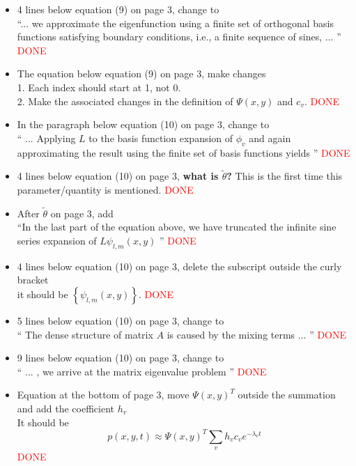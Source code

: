 \documentclass[12pt]{article}
\begin{document}
\begin{itemize}
\item 4 lines below equation (9) on page 3, change to \\
  ``... we approximate the eigenfunction using a finite set of orthogonal basis functions satisfying boundary conditions, i.e., a finite sequence of sines, ... ''
   \textcolor{red}{DONE}

\item The equation below equation (9) on page 3, make changes \\
1. Each index should start at 1, not 0. \\ 
2. Make the associated changes in the definition of $\Psi(x, y)$ and $c_v$.
   \textcolor{red}{DONE}

\item In the paragraph below equation (10) on page 3, change to \\ 
`` ... Applying $L$ to the basis function expansion of $\phi_v $ and again approximating 
the result using the finite set of basis functions yields ''
   \textcolor{red}{DONE}

 \item 4 lines below equation (10) on page 3, {\bf what is
     $\tilde{\theta} $?}  This is the first time this
   parameter/quantity is mentioned.  \textcolor{red}{DONE}

\item After $\tilde{\theta} $ on page 3, add \\
``In the last part of the equation above, we have truncated the infinite sine series 
expansion of $L \psi_{l, m}(x, y)$ ''
 \textcolor{red}{DONE}

\item 4 lines below equation (10) on page 3, delete the subscript outside the curly bracket \\
  it should be $ \left\{ \psi_{l, m}(x, y) \right\} $.
  \textcolor{red}{DONE}

\item 5 lines below equation (10) on page 3, change to \\
  `` The dense structure of matrix $A$ is caused by the mixing terms
  ... '' \textcolor{red}{DONE}

\item 9 lines below equation (10) on page 3, change to \\
  `` ... , we arrive at the matrix eigenvalue problem ''
  \textcolor{red}{DONE}

\item Equation at the bottom of page 3, move $\Psi(x,y)^T $ outside the summation
and add the coefficient $h_v$ \\
It should be
$$ p(x,y,t) \approx \Psi(x,y)^T \sum_v h_v c_v e^{-\lambda_v t}  $$
  \textcolor{red}{DONE}


\end{itemize}
\end{document}
